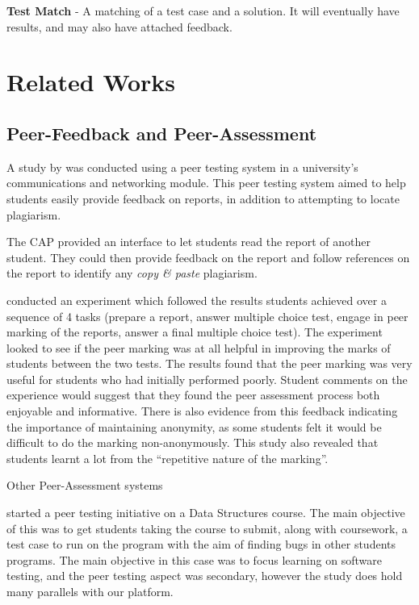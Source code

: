 \documentclass[sigplan,10pt,review]{acmart}\settopmatter{printfolios=true}
\begin{document}
\textbf{Test Match} - A matching of a test case and a solution. 
It will eventually have results, and may also have attached feedback.

\section{Related Works}

\subsection{Peer-Feedback and Peer-Assessment}







A study by \citet{davies_computerized_2000} was conducted using a peer
testing system in a university's communications and networking
module. This peer testing system aimed to help students easily provide
feedback on reports, in addition to attempting to locate plagiarism.

The \ac{CAP} provided an interface to let students read the report of
another student. They could then provide feedback on the report and
follow references on the report to identify any \textit{copy \& paste}
plagiarism.

\citet{davies_computerized_2000} conducted an experiment which
followed the results students achieved over a sequence of 4 tasks
(prepare a report, answer multiple choice test, engage in peer marking
of the reports, answer a final multiple choice test).  The experiment
looked to see if the peer marking was at all helpful in improving the
marks of students between the two tests. The results found that the
peer marking was very useful for students who had initially performed
poorly. Student comments on the experience would suggest that they
found the peer assessment process both enjoyable and
informative. There is also evidence from this feedback indicating the
importance of maintaining anonymity, as some students felt it would be
difficult to do the marking non-anonymously.  This study also revealed
that students learnt a lot from the ``repetitive nature of the
marking''.

Other Peer-Assessment systems
\cite{Aropa} \cite{WebPA}


\citet{goldwasser_gimmick_2002} started a peer testing initiative on a
Data Structures course.  The main objective of this was to get
students taking the course to submit, along with coursework, a test
case to run on the program with the aim of finding bugs in other
students programs. The main objective in this case was to focus
learning on software testing, and the peer testing aspect was
secondary, however the study does hold many parallels with our
platform.
\end{document}
